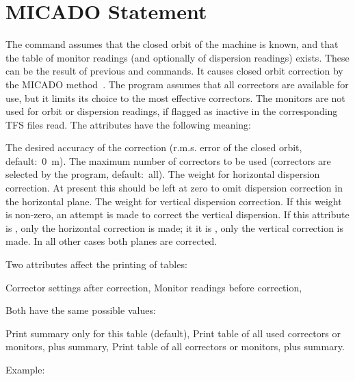 \section{MICADO Statement}
\label{S-MICADO}
The command  assumes that the closed orbit of the machine
is known,
and that the table of monitor readings
(and optionally of dispersion readings) exists.
These can be the result of previous  and
 commands.
It causes closed orbit correction by the MICADO method~\cite{B-AUT73}.
The program assumes that all correctors are available for use,
but it limits its choice to the most effective  correctors.
The monitors are not used for orbit or dispersion readings,
if flagged as inactive in the corresponding TFS files read.
The attributes have the following meaning:
\begin{mylist}
The desired accuracy of the correction
(r.m.s. error of the closed orbit, default:~0~{\rm m}).
The maximum number of correctors to be used
(correctors are selected by the program, default:~all).
The weight for horizontal dispersion correction.
At present this should be left at zero to omit dispersion correction
in the horizontal plane.
The weight for vertical dispersion correction.
If this weight is non-zero,
an attempt is made to correct the vertical dispersion.
If this attribute is , only the horizontal correction is made;
it it is , only the vertical correction is made.
In all other cases both planes are corrected.
\end{mylist}
Two attributes affect the printing of tables:
\begin{mylist}
Corrector settings after correction,
Monitor readings before correction,
\end{mylist}
Both have the same possible values:
\begin{mylist}
Print summary only for this table (default),
Print table of all used correctors or monitors,
plus summary,
Print table of all correctors or monitors, plus summary.
\end{mylist}
Example:
 
